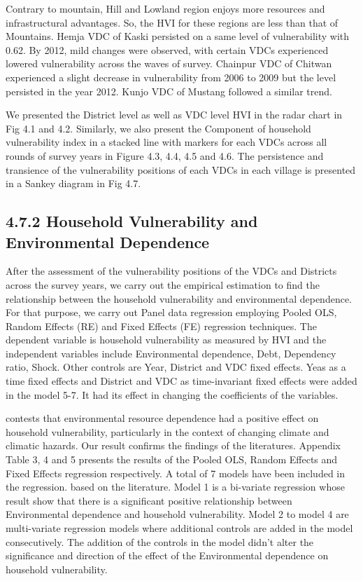 \documentclass[12pt, a4paper]{article}
\begin{document}
Contrary to mountain, Hill and Lowland region enjoys more resources and infrastructural advantages. So, the HVI for these regions are less than that of Mountains.  Hemja VDC of Kaski persisted on a same level of vulnerability with 0.62. By 2012, mild changes were observed, with certain VDCs experienced lowered vulnerability across the waves of survey. Chainpur VDC of Chitwan experienced a slight decrease in vulnerability from 2006 to 2009 but the level persisted in the year 2012. Kunjo VDC of Mustang followed a similar trend.  

We presented the District level as well as VDC level HVI in the radar chart in Fig 4.1 and 4.2. Similarly, we also present the Component of household vulnerability index in a stacked line with markers for each VDCs across all rounds of survey years in Figure 4.3, 4.4, 4.5 and 4.6. The persistence and transience of the vulnerability positions of each VDCs in each village is presented in a Sankey diagram in Fig 4.7.
 

 \subsection*{4.7.2 Household Vulnerability and Environmental Dependence}  
After the assessment of the vulnerability positions of the VDCs and Districts across the survey years, we carry out the empirical estimation to find the relationship between the household vulnerability and environmental dependence. For that purpose, we carry out Panel data regression employing Pooled OLS, Random Effects (RE) and Fixed Effects (FE) regression techniques. The dependent variable is household vulnerability as measured by HVI and the independent variables include Environmental dependence, Debt, Dependency ratio, Shock. Other controls are Year, District and VDC fixed effects. Yeas as a time fixed effects and District and VDC as time-invariant fixed effects were added in the model 5-7. It had its effect in changing the coefficients of the variables. 

\cite{angelsen2015environmental, abbas2018sustainable, gentle2014differential} contests that environmental resource dependence had a positive effect on household vulnerability, particularly in the context of changing climate and climatic hazards. Our result confirms the findings of the literatures. Appendix Table 3, 4 and 5 presents the results of the Pooled OLS, Random Effects and Fixed Effects regression respectively. A total of 7 models have been included in the regression. based on the literature. Model 1 is a bi-variate regression whose result show that there is a significant positive relationship between Environmental dependence and household vulnerability. Model 2 to model 4 are multi-variate regression models where additional controls are added in the model consecutively. The addition of the controls in the model didn't alter the significance and direction of the effect of the Environmental dependence on household vulnerability. 
\end{document}
